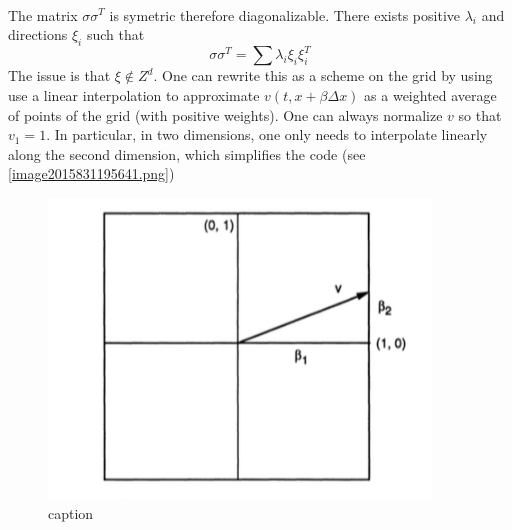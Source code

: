 \documentclass[english]{article}
\begin{document}
\begin{itemize}
\begin{itemize}
\begin{itemize}
\begin{align*}
			\end{align*}
			The matrix $\sigma\sigma^T$ is symetric therefore diagonalizable. There exists positive $\lambda_i$ and directions $\xi_i$ such that
			$$\sigma\sigma^T = \sum \lambda_i \xi_i \xi_i^T$$ 
			The issue is that $\xi \notin Z^d$. One can rewrite this as a scheme on the grid by using use a linear interpolation to approximate $v(t, x+\beta \Delta x) $ as a weighted average of points of the grid (with positive weights). 
			One can always normalize $v$ so that $v_1 = 1$. In particular, in two dimensions, one only needs to interpolate linearly along the second dimension, which simplifies the code (see \autoref{image2015831195641.png})
			\begin{figure}[htp]
				\centering
				\includegraphics[width=4in]{image2015831195641.png}
				\caption{\label{image2015831195641.png}caption}
			\end{figure}
		\end{itemize}
	\end{itemize}
\end{itemize}
\end{document}
